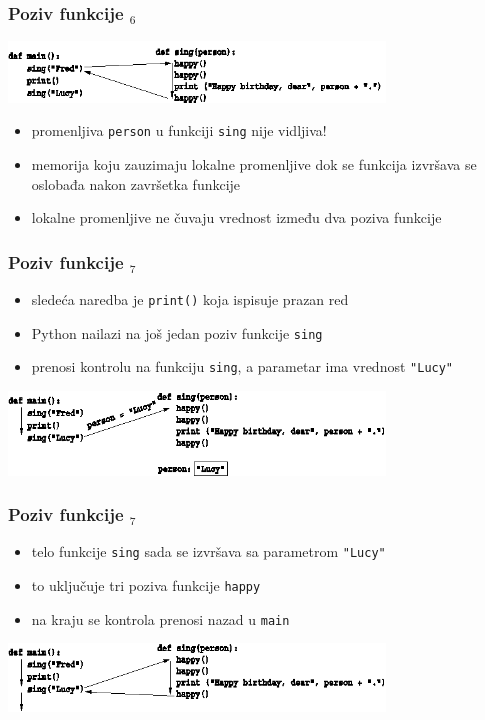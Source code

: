 \documentclass[compress]{beamer}
\begin{document}
\begin{frame}[fragile]
  \frametitle{Poziv funkcije $_6$}
  \begin{center}
    \includegraphics[width=10cm]{pic06}
  \end{center}
  \begin{itemize}
    \item promenljiva \texttt{person} u funkciji \texttt{sing} nije vidljiva!
    \item memorija koju zauzimaju lokalne promenljive dok se funkcija izvršava se oslobađa nakon završetka funkcije
    \item lokalne promenljive ne čuvaju vrednost između dva poziva funkcije
  \end{itemize}
\end{frame}

\begin{frame}[fragile]
  \frametitle{Poziv funkcije $_7$}
  \begin{itemize}
    \item sledeća naredba je \texttt{print()} koja ispisuje prazan red
    \item Python nailazi na još jedan poziv funkcije \texttt{sing}
    \item prenosi kontrolu na funkciju \texttt{sing}, a parametar ima vrednost \texttt{"Lucy"}
  \end{itemize}
  \begin{center}
    \includegraphics[width=10cm]{pic07}
  \end{center}
\end{frame}

\begin{frame}[fragile]
  \frametitle{Poziv funkcije $_7$}
  \begin{itemize}
    \item telo funkcije \texttt{sing} sada se izvršava sa parametrom \texttt{"Lucy"}
    \item to uključuje tri poziva funkcije \texttt{happy}
    \item na kraju se kontrola prenosi nazad u \texttt{main}
  \end{itemize}
  \begin{center}
    \includegraphics[width=10cm]{pic08}
  \end{center}
\end{frame}
\end{document}
